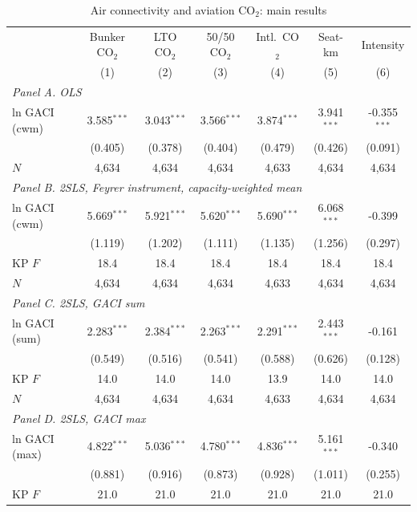 \begin{table}[htbp]
\centering
\begin{threeparttable}
\caption{Air connectivity and aviation CO$_2$: main results}
\label{tab:main}
\footnotesize
\begin{tabular}{lcccccc}
\toprule
 & \multicolumn{1}{c}{Bunker CO$_2$} & \multicolumn{1}{c}{LTO CO$_2$} & \multicolumn{1}{c}{50/50 CO$_2$} & \multicolumn{1}{c}{Intl.\ CO$_2$} & \multicolumn{1}{c}{Seat-km} & \multicolumn{1}{c}{Intensity} \\
 & (1) & (2) & (3) & (4) & (5) & (6) \\
\midrule
\multicolumn{7}{l}{\textit{Panel A. OLS}} \\
  ln GACI (cwm) & 3.585$^{***}$ & 3.043$^{***}$ & 3.566$^{***}$ & 3.874$^{***}$ & 3.941$^{***}$ & -0.355$^{***}$ \\
   & (0.405) & (0.378) & (0.404) & (0.479) & (0.426) & (0.091) \\
  $N$ & 4,634 & 4,634 & 4,634 & 4,633 & 4,634 & 4,634 \\
\midrule
\multicolumn{7}{l}{\textit{Panel B. 2SLS, Feyrer instrument, capacity-weighted mean}} \\
  ln GACI (cwm) & 5.669$^{***}$ & 5.921$^{***}$ & 5.620$^{***}$ & 5.690$^{***}$ & 6.068$^{***}$ & -0.399 \\
   & (1.119) & (1.202) & (1.111) & (1.135) & (1.256) & (0.297) \\
  KP $F$ & 18.4 & 18.4 & 18.4 & 18.4 & 18.4 & 18.4 \\
  $N$ & 4,634 & 4,634 & 4,634 & 4,633 & 4,634 & 4,634 \\
\midrule
\multicolumn{7}{l}{\textit{Panel C. 2SLS, GACI sum}} \\
  ln GACI (sum) & 2.283$^{***}$ & 2.384$^{***}$ & 2.263$^{***}$ & 2.291$^{***}$ & 2.443$^{***}$ & -0.161 \\
   & (0.549) & (0.516) & (0.541) & (0.588) & (0.626) & (0.128) \\
  KP $F$ & 14.0 & 14.0 & 14.0 & 13.9 & 14.0 & 14.0 \\
  $N$ & 4,634 & 4,634 & 4,634 & 4,633 & 4,634 & 4,634 \\
\midrule
\multicolumn{7}{l}{\textit{Panel D. 2SLS, GACI max}} \\
  ln GACI (max) & 4.822$^{***}$ & 5.036$^{***}$ & 4.780$^{***}$ & 4.836$^{***}$ & 5.161$^{***}$ & -0.340 \\
   & (0.881) & (0.916) & (0.873) & (0.928) & (1.011) & (0.255) \\
  KP $F$ & 21.0 & 21.0 & 21.0 & 21.0 & 21.0 & 21.0 \\

\end{tabular}
\end{threeparttable}
\end{table}

